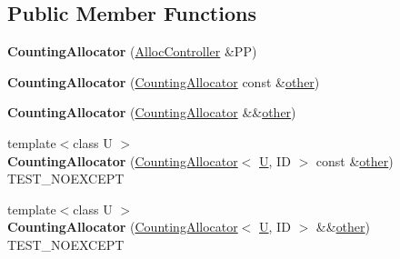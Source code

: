 \subsection*{Public Member Functions}
\begin{DoxyCompactItemize}
\item 
\mbox{\label{class_counting_allocator_3_01void_00_01_i_d_01_4_a15b0a04053bae26f4ba67b59a7792260}} 
{\bfseries Counting\+Allocator} (\mbox{\hyperlink{struct_alloc_controller}{Alloc\+Controller}} \&PP)
\item 
\mbox{\label{class_counting_allocator_3_01void_00_01_i_d_01_4_ab6727c747f8b7b1954e7227319b20eb4}} 
{\bfseries Counting\+Allocator} (\mbox{\hyperlink{class_counting_allocator}{Counting\+Allocator}} const \&\mbox{\hyperlink{structother}{other}})
\item 
\mbox{\label{class_counting_allocator_3_01void_00_01_i_d_01_4_af62a6b2cd0eb77a77160ac625d88d4d6}} 
{\bfseries Counting\+Allocator} (\mbox{\hyperlink{class_counting_allocator}{Counting\+Allocator}} \&\&\mbox{\hyperlink{structother}{other}})
\item 
\mbox{\label{class_counting_allocator_3_01void_00_01_i_d_01_4_abafd9505d92cdee6a1680202f0a33bf3}} 
{\footnotesize template$<$class U $>$ }\\{\bfseries Counting\+Allocator} (\mbox{\hyperlink{class_counting_allocator}{Counting\+Allocator}}$<$ \mbox{\hyperlink{union_u}{U}}, ID $>$ const \&\mbox{\hyperlink{structother}{other}}) T\+E\+S\+T\+\_\+\+N\+O\+E\+X\+C\+E\+PT
\item 
\mbox{\label{class_counting_allocator_3_01void_00_01_i_d_01_4_abaf250c9bf4aa1494b8187991950a459}} 
{\footnotesize template$<$class U $>$ }\\{\bfseries Counting\+Allocator} (\mbox{\hyperlink{class_counting_allocator}{Counting\+Allocator}}$<$ \mbox{\hyperlink{union_u}{U}}, ID $>$ \&\&\mbox{\hyperlink{structother}{other}}) T\+E\+S\+T\+\_\+\+N\+O\+E\+X\+C\+E\+PT
\item 
\mbox{\label{class_counting_allocator_3_01void_00_01_i_d_01_4_ad1185e041b8181167579c42201bac692}} 

\end{DoxyCompactItemize}
